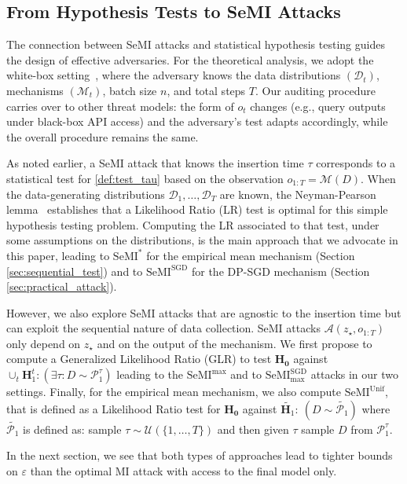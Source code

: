 \documentclass{article}
\theoremstyle{plain}
\theoremstyle{definition}
\theoremstyle{remark}
\newcommand{\cM}{\ensuremath{\mathcal{M}}}
\newcommand{\cP}{\ensuremath{\mathcal{P}}}
\newcommand{\cA}{\ensuremath{\mathcal{A}}}
\newcommand{\cD}{\ensuremath{\mathcal{D}}}
\newcommand{\SeMIstar}{\mathrm{SeMI}^{\ast}}
\newcommand{\SeMISGD}{\mathrm{SeMI}^{\mathrm{SGD}}}
\newcommand{\SeMISGDmax}{\mathrm{SeMI}^{\mathrm{SGD}}_{\max}}
\newcommand{\SeMIunif}{\mathrm{SeMI}^{\mathrm{Unif}}}
\newcommand{\SeMImax}{\mathrm{SeMI}^{\max}}
\newcommand{\cU}{\mathcal{U}}
\begin{document}
\subsection{From Hypothesis Tests to SeMI Attacks}

The connection between SeMI attacks and statistical hypothesis testing guides the design of effective adversaries. For the theoretical analysis, we adopt the white-box setting~\citep{sablayrolles2019white,carlini2022membership,nasrTightAuditingDifferentially2023, maddockCANIFECraftingCanaries2023}, where the adversary knows the data distributions $(\mathcal{D}_t)$, mechanisms $(\mathcal{M}_t)$, batch size $n$, and total steps $T$. %
Our auditing procedure carries over to other threat models: the form of $o_t$ changes (e.g., query outputs under black-box API access) and the adversary's test adapts accordingly, while the overall procedure remains the same.

As noted earlier, a SeMI attack that knows the insertion time $\tau$ corresponds to a statistical test for \eqref{def:test_tau} based on the observation $o_{1:T}=\cM(D)$. When the data-generating distributions $\cD_1,\dots,\cD_T$ are known, the Neyman-Pearson lemma~\citep{neyman1933ix} establishes that a Likelihood Ratio (LR) test is optimal for this simple hypothesis testing problem. Computing the LR associated to that test, under some assumptions on the distributions, is the main approach that we advocate in this paper, leading to $\SeMIstar$ for the empirical mean mechanism (Section \ref{sec:sequential_test}) and to $\SeMISGD$ for the DP-SGD mechanism (Section \ref{sec:practical_attack}).

However, we also explore SeMI attacks that are agnostic to the insertion time but can exploit the sequential nature of data collection. SeMI attacks $\cA(z_\star,o_{1:T})$ only depend on $z_\star$ and on the output of the mechanism. We first propose to compute a Generalized Likelihood Ratio (GLR) to test $\mathbf{H_0}$ against $ \cup_t\mathbf{H}_1^{t}: (\exists \tau : D \sim \cP_{1}^{\tau})$
leading to the $\SeMImax$ and to $\SeMISGDmax$ attacks in our two settings. Finally, for the empirical mean mechanism, we also compute $\SeMIunif$, that is defined as a Likelihood Ratio test for $ \mathbf{H_0}$ against $\widetilde{\mathbf{H}_1}: \ ( D \sim \widetilde{\cP_{1}})$
where $\widetilde{\cP_1}$ is defined as: sample $\tau \sim \cU(\{1,\dots,T\})$ and then given $\tau$ sample $D$ from $\cP_1^{\tau}$.

In the next section, we see that both types of approaches lead to tighter bounds on $\varepsilon$ than the optimal MI attack with access to the final model only.
\end{document}
